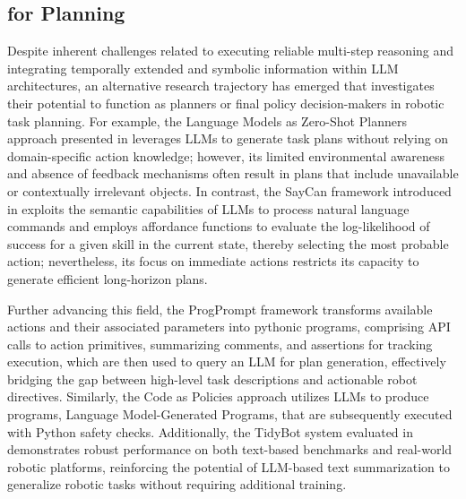



\subsection{\llm for Planning}
Despite inherent challenges related to executing reliable multi-step reasoning and integrating temporally extended and symbolic information within LLM architectures, an alternative research trajectory has emerged that investigates their potential to function as planners or final policy decision-makers in robotic task planning. For example, the Language Models as Zero-Shot Planners approach presented in \cite{huang2022languagemodelszeroshotplanners} leverages LLMs to generate task plans without relying on domain-specific action knowledge; however, its limited environmental awareness and absence of feedback mechanisms often result in plans that include unavailable or contextually irrelevant objects. In contrast, the SayCan framework introduced in \cite{ichter2022do} exploits the semantic capabilities of LLMs to process natural language commands and employs affordance functions to evaluate the log-likelihood of success for a given skill in the current state, thereby selecting the most probable action; nevertheless, its focus on immediate actions restricts its capacity to generate efficient long-horizon plans.

Further advancing this field, the ProgPrompt framework \cite{singh2022progpromptgeneratingsituatedrobot} transforms available actions and their associated parameters into pythonic programs, comprising API calls to action primitives, summarizing comments, and assertions for tracking execution, which are then used to query an LLM for plan generation, effectively bridging the gap between high-level task descriptions and actionable robot directives. Similarly, the Code as Policies approach \cite{10160591} utilizes LLMs to produce programs, Language Model-Generated Programs, that are subsequently executed with Python safety checks. Additionally, the TidyBot system evaluated in \cite{Wu_2023} demonstrates robust performance on both text-based benchmarks and real-world robotic platforms, reinforcing the potential of LLM-based text summarization to generalize robotic tasks without requiring additional training.


